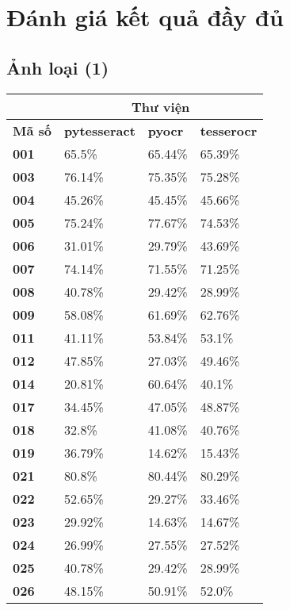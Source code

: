 \documentclass[12pt,a4paper]{article}
\begin{document}
\section{Đánh giá kết quả đầy đủ}

\subsection{Ảnh loại (1)}

\begin{longtable}{|p{}|p{}|p{}|p{}|}
\hline & \multicolumn{3}{c|}{Thư viện} \\
\hline \textbf{Mã số} & \textbf{pytesseract} & \textbf{pyocr} & \textbf{tesserocr} \\
\hline \textbf{001} & 65.5\% & 65.44\% & 65.39\% \\
\hline \textbf{003} & 76.14\% & 75.35\% & 75.28\% \\
\hline \textbf{004} & 45.26\% & 45.45\% & 45.66\% \\
\hline \textbf{005} & 75.24\% & 77.67\% & 74.53\% \\
\hline \textbf{006} & 31.01\% & 29.79\% & 43.69\% \\
\hline \textbf{007} & 74.14\% & 71.55\% & 71.25\% \\
\hline \textbf{008} & 40.78\% & 29.42\% & 28.99\% \\
\hline \textbf{009} & 58.08\% & 61.69\% & 62.76\% \\
\hline \textbf{011} & 41.11\% & 53.84\% & 53.1\% \\
\hline \textbf{012} & 47.85\% & 27.03\% & 49.46\% \\
\hline \textbf{014} & 20.81\% & 60.64\% & 40.1\% \\
\hline \textbf{017} & 34.45\% & 47.05\% & 48.87\% \\
\hline \textbf{018} & 32.8\% & 41.08\% & 40.76\% \\
\hline \textbf{019} & 36.79\% & 14.62\% & 15.43\% \\
\hline \textbf{021} & 80.8\% & 80.44\% & 80.29\% \\
\hline \textbf{022} & 52.65\% & 29.27\% & 33.46\% \\
\hline \textbf{023} & 29.92\% & 14.63\% & 14.67\% \\
\hline \textbf{024} & 26.99\% & 27.55\% & 27.52\% \\
\hline \textbf{025} & 40.78\% & 29.42\% & 28.99\% \\
\hline \textbf{026} & 48.15\% & 50.91\% & 52.0\% \\

\end{longtable}
\end{document}
